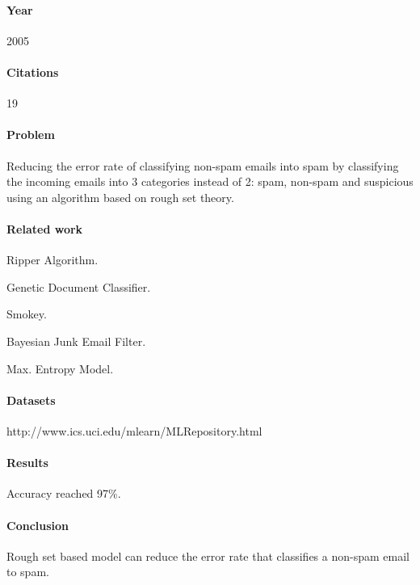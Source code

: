 \documentclass[12pt]{article}
\newenvironment{my_itemize}
{\begin{itemize}
  \setlength{\itemsep}{0cm}
  \setlength{\parskip}{0cm}}
{\end{itemize}}
\begin{document}
\paragraph{Year} 2005
\paragraph{Citations} 19

\paragraph{Problem}
\begin{my_itemize}
  \item Reducing the error rate of classifying non-spam emails into spam by classifying 
	the incoming emails into 3 categories instead of 2: spam, non-spam and suspicious
	using an algorithm based on rough set theory.
\end{my_itemize}

\paragraph{Related work}
\begin{my_itemize}
  \item Ripper Algorithm.
  \item Genetic Document Classifier.
  \item Smokey.
  \item Bayesian Junk Email Filter.
  \item Max. Entropy Model.
\end{my_itemize}

\paragraph{Datasets}
\begin{my_itemize}
  \item http://www.ics.uci.edu/mlearn/MLRepository.html
\end{my_itemize}

\paragraph{Results}
\begin{my_itemize}
  \item Accuracy reached 97\%.
\end{my_itemize}

\paragraph{Conclusion}
\begin{my_itemize}
  \item Rough set based model can reduce the error rate that classifies a non-spam email to spam.
\end{my_itemize}
\end{document}
